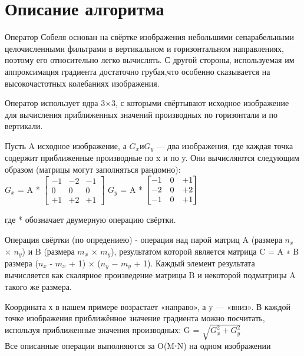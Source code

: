 \documentclass{report}
\begin{document}
\section*{Описание алгоритма}
Оператор Собеля основан на свёртке изображения небольшими сепарабельными целочисленными фильтрами в вертикальном и горизонтальном направлениях, поэтому его относительно легко вычислять. С другой стороны, используемая им аппроксимация градиента достаточно грубая,что особенно сказывается на высокочастотных колебаниях изображения. 

\par  Оператор использует ядра 3×3, с которыми свёртывают исходное изображение для вычисления приближенных значений производных по горизонтали и по вертикали.\\
\par Пусть A исходное изображение, а $G_x и G_y$ — два изображения, где каждая точка содержит приближенные производные по x и по y. Они вычисляются следующим образом (матрицы могут заполняться рандомно): \\
$G_x$ = A *  
$
\begin{bmatrix}
    -1 & -2 & -1\\
     0 & 0 & 0\\
    +1 & +2 & +1
\end{bmatrix}
$
  $G_y$ = A * 
$
\begin{bmatrix}
    -1 & 0 & +1\\
    -2 & 0 & +2\\
    -1 & 0 & +1
\end{bmatrix} \\
$

где * обозначает двумерную операцию свёртки.
\par  Операция свёртки (по опредениею) -  операция над парой матриц A (размера $n_x$ × $n_y$) и B (размера  $m_x$ × $m_y$), результатом которой является матрица C = A ∗ B размера ($n_x$ - $m_x$ + 1) × ($n_y$ − $m_y$ + 1). Каждый элемент результата вычисляется как скалярное произведение матрицы B и некоторой подматрицы A такого же размера.\\ 
\par Координата х в нашем примере возрастает «направо», а y — «вниз». В каждой точке изображения приближённое значение градиента можно посчитать, используя приближенные значения производных:
G = $\sqrt {G_x^2 + G_y^2} $ \\
Все описанные операции выполняются за O(M⋅N) на одном изображении
\end{document}
